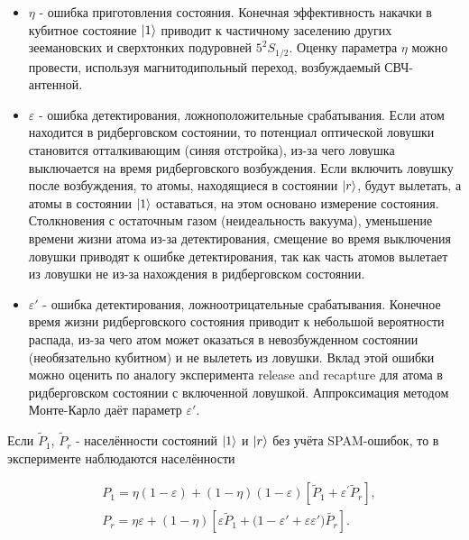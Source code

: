 \begin{itemize}
	\item $\eta$ - 	ошибка приготовления состояния.
	Конечная эффективность накачки в кубитное состояние $\left| 1 \right\rangle$ приводит к частичному заселению других зеемановских и сверхтонких подуровней $5^2S_{1/2}$. Оценку параметра $\eta$ можно провести, используя магнитодипольный переход, возбуждаемый СВЧ-антенной.

	\item $\varepsilon$ - ошибка детектирования, ложноположительные срабатывания. Если атом находится в ридберговском состоянии, то потенциал оптической ловушки становится отталкивающим (синяя отстройка), из-за чего ловушка выключается на время ридберговского возбуждения. Если включить ловушку после возбуждения, то атомы, находящиеся в состоянии $\left| r \right\rangle$, будут вылетать, а атомы в состоянии $\left| 1 \right\rangle$ оставаться, на этом основано измерение состояния. Столкновения с остаточным газом (неидеальность вакуума), уменьшение времени жизни атома из-за детектирования, смещение во время выключения ловушки приводят к ошибке детектирования, так как часть атомов вылетает из ловушки не из-за нахождения в ридберговском состоянии.

	\item $\varepsilon'$ - ошибка детектирования, ложноотрицательные срабатывания. Конечное время жизни ридберговского состояния приводит к небольшой вероятности распада, из-за чего атом может оказаться в невозбужденном состоянии (необязательно кубитном) и не вылететь из ловушки. Вклад этой ошибки можно оценить по аналогу эксперимента release and recapture для атома в ридберговском состоянии с включенной ловушкой. Аппроксимация методом Монте-Карло даёт параметр $\varepsilon'$.
\end{itemize}

Если $\tilde{P}_1$, $\tilde{P}_r$ - населённости состояний $\left| 1 \right\rangle$ и $\left| r \right\rangle$ без учёта SPAM-ошибок, то в эксперименте наблюдаются населённости \cite{Browayes}


\begin{equation}
	\begin{aligned}
		& P_1=\eta\left(1-\varepsilon\right)+\left(1-\eta\right)\left(1-\varepsilon\right)\left[\tilde{P}_1+\varepsilon^\prime\tilde{P}_r\right], \\
		& P_r=\eta\varepsilon+\left(1-\eta\right)\left[\varepsilon\tilde{P}_1+{(1-\varepsilon}'+\varepsilon\varepsilon')\tilde{P_r}\right].
	\end{aligned}
\end{equation}


